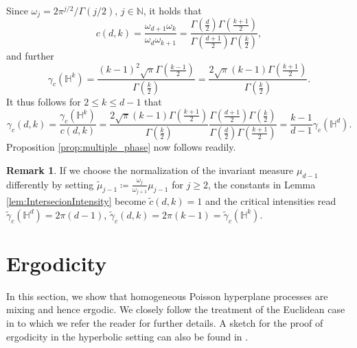 \documentclass[12pt,a4paper]{article}
\theoremstyle{definition}
\newtheorem{remark}[proposition]{Remark}
\renewcommand{\H}{\mathbb{H}}
\newcommand{\N}{\mathbb{N}}
\begin{document}
Since $\omega_j = 2 \pi^{j/2}/\Gamma(j/2)$, $j\in\N$, it holds that
\[ c(d,k) = \frac{\omega_{d+1}\omega_{k}}{\omega_{d}\omega_{k+1}} = \frac{\Gamma(\frac{d}{2})\Gamma(\frac{k+1}{2})}{\Gamma(\frac{d+1}{2})\Gamma(\frac{k}{2})}, \]
and further 
\[ \gamma_c(\H^k) = \frac{(k-1)^2 \sqrt{\pi}\Gamma(\frac{k-1}{2})}{\Gamma(\frac{k}{2})} = \frac{2\sqrt{\pi}(k-1)\Gamma(\frac{k+1}{2})}{\Gamma(\frac{k}{2})}. \]
It thus follows for $2 \leq k \leq d-1$ that
\[ \gamma_c(d,k) = \frac{\gamma_c(\H^k)}{c(d,k)} = \frac{2\sqrt{\pi}(k-1)\Gamma(\frac{k+1}{2})}{\Gamma(\frac{k}{2})} \frac{\Gamma(\frac{d+1}{2})\Gamma(\frac{k}{2})}{\Gamma(\frac{d}{2})\Gamma(\frac{k+1}{2})}  = \frac{k-1}{d-1} \gamma_c(\H^d). \]
Proposition \ref{prop:multiple_phase} now follows readily.


\begin{remark}
    If we choose the normalization of the invariant measure $\mu_{d-1}$ differently by setting $\widetilde\mu_{j-1} \coloneqq \frac{\omega_j}{\omega_{j+1}} \mu_{j-1}$ for $j \geq 2$, the constants in Lemma \ref{lem:IntersecionIntensity} become $\widetilde c(d,k) = 1$ and the critical intensities
    read $\widetilde\gamma_c(\H^d) = 2\pi(d-1)$, $\widetilde\gamma_c(d,k) = 2\pi(k-1) = \widetilde\gamma_c(\H^k)$.
\end{remark}

\printbibliography

\newpage
\appendix

\section{Ergodicity}

In this section, we show that homogeneous Poisson hyperplane processes are mixing and hence ergodic. We closely follow the treatment of the Euclidean case in \cite[Chapter~7]{HS} to which we refer the reader for further details.
A sketch for the proof of ergodicity in the hyperbolic setting can also be found in \cite[Proposition 2.1]{BT15}.
\end{document}
